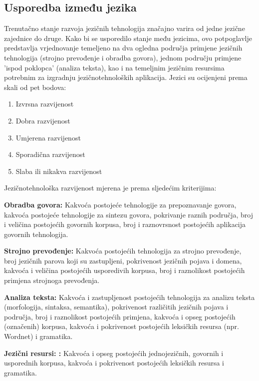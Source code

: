 \begin{multicols}{2}
\subsection{Usporedba između jezika}

Trenutačno stanje razvoja jezičnih tehnologija značajno varira od jedne jezične zajednice do druge. Kako bi se usporedilo stanje među jezicima, ovo potpoglavlje predstavlja vrjednovanje temeljeno na dva ogledna područja primjene jezičnih tehnologija (strojno prevođenje i obradba govora), jednom području primjene 'ispod poklopca' (analiza teksta), kao i na temeljnim jezičnim resursima potrebnim za izgradnju jezičnotehnoloških aplikacija. Jezici su ocijenjeni prema skali od pet bodova:

\begin{enumerate}
\item Izvrsna razvijenost
\item Dobra razvijenost
\item Umjerena razvijenost
\item Sporadična razvijenost
\item Slaba ili nikakva razvijenost
\end{enumerate}

Jezičnotehnološka razvijenost mjerena je prema sljedećim kriterijima:

\smallskip
\textbf{Obradba govora:} Kakvoća postojeće tehnologije za prepoznavanje govora, kakvoća postojeće tehnologije za sintezu govora, pokrivanje raznih područja, broj i veličina postojećih govornih korpusa, broj i raznovrsnost postojećih aplikacija govornih tehnologija.

\textbf{Strojno prevođenje:} Kakvoća postojećih tehnologija za strojno prevođenje, broj jezičnih parova koji su zastupljeni, pokrivenost jezičnih pojava i domena, kakvoća i veličina postojećih usporedivih korpusa, broj i raznolikost postojećih primjena strojnoga prevođenja.

\textbf{Analiza teksta:} Kakvoća i zastupljenost postojećih tehnologija za analizu teksta (morfologija, sintaksa, semantika), pokrivenost različitih jezičnih pojava i područja, broj i raznolikost postojećih primjena, kakvoća i opseg postojećih (označenih) korpusa, kakvoća i pokrivenost postojećih leksičkih resursa (npr. Wordnet) i gramatika.

\textbf{Jezični resursi: :} Kakvoća i opseg postojećih jednojezičnih, govornih i usporednih korpusa, kakvoća i pokrivenost postojećih leksičkih resursa i gramatika.


\end{multicols}
